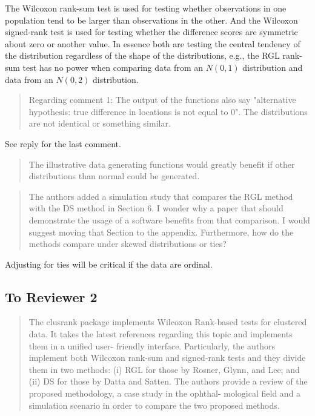 \documentclass[12pt]{article}
\newenvironment{comment}%
{\begin{quotation}\noindent\small\it\ignorespaces%
  }{\end{quotation}}
\begin{document}
The Wilcoxon rank-sum test is used for testing whether observations in one
population tend to be larger than observations in the other. And the
Wilcoxon signed-rank test is used for testing whether the difference scores
are symmetric about zero or another value. In essence both are testing the
central tendency of the distribution regardless of the shape of the
distributions, e.g., the RGL rank-sum test has no power when comparing data
from an $N(0, 1)$ distribution and data from an $N(0, 2)$ distribution.

\begin{comment}
Regarding comment 1: The output of the functions also say "alternative
hypothesis: true difference in locations is not equal to 0". The distributions are
not identical or something similar.
\end{comment}

See reply for the last comment.

\begin{comment}
The illustrative data generating functions would greatly benefit if other
distributions than normal could be generated.
\end{comment}

\begin{comment}
The authors added a simulation study that compares the RGL method with the
DS method in Section 6. I wonder why a paper that should demonstrate the
usage of a software benefits from that comparison. I would suggest moving
that Section to the appendix. Furthermore, how do the methods compare
under skewed distributions or ties?
\end{comment}

Adjusting for ties will be critical if the data are ordinal.


\subsection*{To Reviewer 2}

\begin{comment}
The clusrank package implements Wilcoxon Rank-based tests for clustered
data. It takes the latest references regarding this topic and implements
them in a unified user- friendly interface. Particularly, the authors
implement both Wilcoxon rank-sum and signed-rank tests and they divide
them in two methods: (i) RGL for those by Rosner, Glynn, and Lee; and (ii)
DS for those by Datta and Satten.  The authors provide a review of the
proposed methodology, a case study in the ophthal- mological field and a
simulation scenario in order to compare the two proposed methods.
\end{comment}
\end{document}
